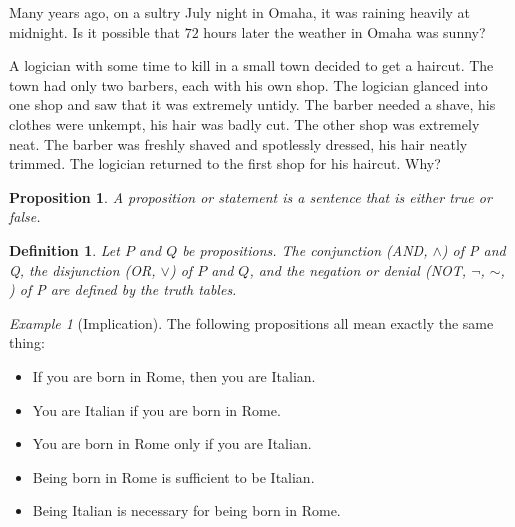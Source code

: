 \documentclass[11pt]{exam}
\newtheorem{definition}[thm]{Definition}
\newtheorem{proposition}[thm]{Proposition}
\theoremstyle{remark}
\newtheorem{example}[thm]{Example}
\numberwithin{equation}{section}
\begin{document}
 \headrule


\begin{questions}
\question Many years ago, on a sultry July night in Omaha, it was raining 
heavily at midnight. Is it possible that $72$ hours later the weather in 
Omaha was sunny?

\newpage


\question A logician with some time to kill in a small town decided to get a 
haircut. The town had only two barbers, each with his own shop. The 
logician glanced into one shop and saw that it was extremely untidy. 
The barber needed a shave, his clothes were unkempt, his hair was 
badly cut. The other shop was extremely neat. The barber was freshly 
shaved and spotlessly dressed, his hair neatly trimmed. The logician 
returned to the first shop for his haircut. Why? 


\newpage

\begin{proposition}
    A proposition or statement is a sentence that is either true or false.
\end{proposition}

\vspace{2in}

\begin{definition}
    Let $P$ and $Q$ be propositions. The conjunction (AND, $\land$) of P and Q, the disjunction
(OR, $\lor$) of $P$ and $Q$, and the negation or denial (NOT, $\lnot$, $\sim$, ) of P are defined by the truth tables.
\end{definition}


\vspace{2in}

\begin{example}[Implication]
The following propositions all mean exactly the same thing:

\begin{itemize}
    \item  If you are born in Rome, then you are Italian.
    \item You are Italian if you are born in Rome.
    \item You are born in Rome only if you are Italian.
    \item Being born in Rome is sufficient to be Italian.
    \item Being Italian is necessary for being born in Rome.
\end{itemize}
\end{example}


\end{questions}
\end{document}
